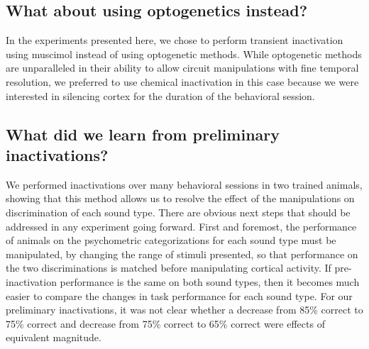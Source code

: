 \subsection{What about using optogenetics instead?} %
In the experiments presented here, we chose to perform transient inactivation using muscimol instead of using optogenetic methods. 
%
While optogenetic methods are unparalleled in their ability to allow circuit manipulations with fine temporal resolution, we preferred to use chemical inactivation in this case because we were interested in silencing cortex for the duration of the behavioral session. 



\subsection{What did we learn from preliminary inactivations?}
We performed inactivations over many behavioral sessions in two trained animals, showing that this method allows us to resolve the effect of the manipulations on discrimination of each sound type. 
%
There are obvious next steps that should be addressed in any experiment going forward. 
%
First and foremost, the performance of animals on the psychometric categorizations for each sound type must be manipulated, by changing the range of stimuli presented, so that performance on the two discriminations is matched before manipulating cortical activity. 
%
If pre-inactivation performance is the same on both sound types, then it becomes much easier to compare the changes in task performance for each sound type. 
%
For our preliminary inactivations, it was not clear whether a decrease from 85\% correct to 75\% correct and decrease from 75\% correct to 65\% correct were effects of equivalent magnitude. 


